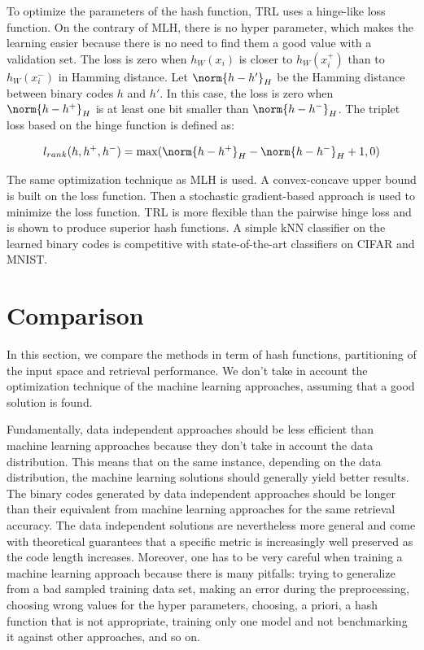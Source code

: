 To optimize the parameters of the hash function, TRL uses a hinge-like loss function. On the contrary of MLH, there is no hyper parameter, which makes the learning easier because there is no need to find them a good value with a validation set. The loss is zero when $h_W(x_i)$ is closer to $h_W(x^{+}_i)$ than to $h_W(x^{-}_i)$ in Hamming distance. Let $\norm{h - h'}_{H}$ be the Hamming distance between binary codes $h$ and $h'$. In this case, the loss is zero when $\norm{h - h^{+}}_{H}$ is at least one bit smaller than $\norm{h - h^{-}}_{H}$. The triplet loss based on the hinge function is defined as:

\[
	l_{rank}(h, h^{+}, h^{-})=\max(\norm{h - h^{+}}_{H} - \norm{h - h^{-}}_{H} + 1, 0)
\]

The same optimization technique as MLH is used. A convex-concave upper bound is built on the loss function. Then a stochastic gradient-based approach is used to minimize the loss function. TRL is more flexible than the pairwise hinge loss and is shown to produce superior hash functions. A simple kNN classifier on the learned binary codes is competitive with state-of-the-art classifiers on CIFAR and MNIST.

\section{Comparison}
In this section, we compare the methods in term of hash functions, partitioning of the input space and retrieval performance. We don't take in account the optimization technique of the machine learning approaches, assuming that a good solution is found.

Fundamentally, data independent approaches should be less efficient than machine learning approaches because they don't take in account the data distribution. This means that on the same instance, depending on the data distribution, the machine learning solutions should generally yield better results. The binary codes generated by data independent approaches should be longer than their equivalent from machine learning approaches for the same retrieval accuracy. The data independent solutions are nevertheless more general and come with theoretical guarantees that a specific metric is increasingly well preserved as the code length increases. Moreover, one has to be very careful when training a machine learning approach because there is many pitfalls: trying to generalize from a bad sampled training data set, making an error during the preprocessing, choosing wrong values for the hyper parameters, choosing, a priori, a hash function that is not appropriate, training only one model and not benchmarking it against other approaches, and so on.


